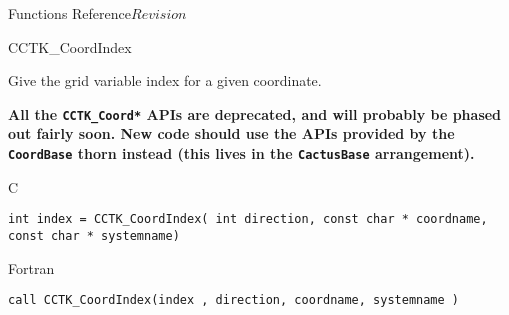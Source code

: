 \begin{cactuspart}{ Functions Reference}{}{$Revision$}

\begin{FunctionDescription}{CCTK\_CoordIndex}%
{Give the grid variable index for a given coordinate.

\textbf{All the \texttt{CCTK\_Coord*} APIs are deprecated,
and will probably be phased out fairly soon.
New code should use the APIs provided by the \texttt{CoordBase} thorn
instead (this lives in the \texttt{CactusBase} arrangement).}
}
\label{CCTK-CoordIndex}
\begin{SynopsisSection}
\begin{Synopsis}{C}
\begin{verbatim}int index = CCTK_CoordIndex( int direction, const char * coordname, const char * systemname)\end{verbatim}
\end{Synopsis}
\begin{Synopsis}{Fortran}
\begin{verbatim}call CCTK_CoordIndex(index , direction, coordname, systemname )


\end{verbatim}
\end{Synopsis}
\end{SynopsisSection}
\end{FunctionDescription}
\end{cactuspart}
